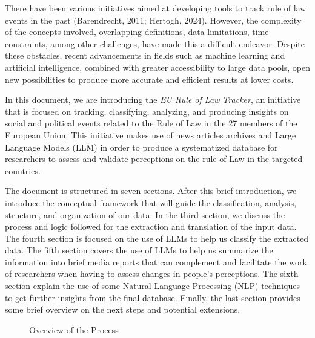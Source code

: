\documentclass[
]{agujournal2019}
\begin{document}
There have been various initiatives aimed at developing tools to track
rule of law events in the past (Barendrecht, 2011; Hertogh, 2024).
However, the complexity of the concepts involved, overlapping
definitions, data limitations, time constraints, among other challenges,
have made this a difficult endeavor. Despite these obstacles, recent
advancements in fields such as machine learning and artificial
intelligence, combined with greater accessibility to large data pools,
open new possibilities to produce more accurate and efficient results at
lower costs.

In this document, we are introducing the \emph{EU Rule of Law Tracker},
an initiative that is focused on tracking, classifying, analyzing, and
producing insights on social and political events related to the Rule of
Law in the 27 members of the European Union. This initiative makes use
of news articles archives and Large Language Models (LLM) in order to
produce a systematized database for researchers to assess and validate
perceptions on the rule of Law in the targeted countries.

The document is structured in seven sections. After this brief
introduction, we introduce the conceptual framework that will guide the
classification, analysis, structure, and organization of our data. In
the third section, we discuss the process and logic followed for the
extraction and translation of the input data. The fourth section is
focused on the use of LLMs to help us classify the extracted data. The
fifth section covers the use of LLMs to help us summarize the
information into brief media reports that can complement and facilitate
the work of researchers when having to assess changes in people's
perceptions. The sixth section explain the use of some Natural Language
Processing (NLP) techniques to get further insights from the final
database. Finally, the last section provides some brief overview on the
next steps and potential extensions.

\begin{figure}

\caption{\label{fig-flow}Overview of the Process}


\end{figure}%
\end{document}
